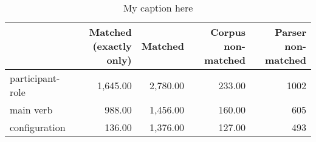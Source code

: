 \begin{table}[!ht]
\centering
\begin{tabular}{lrrrr}
\toprule
{} &  Matched (exactly only) &  Matched &  Corpus non-matched &  Parser non-matched \\
\midrule
participant-role &                1,645.00 & 2,780.00 &              233.00 &                1002 \\
main verb        &                  988.00 & 1,456.00 &              160.00 &                 605 \\
configuration    &                  136.00 & 1,376.00 &              127.00 &                 493 \\
\bottomrule
\end{tabular}
\caption{My caption here}
\label{tab:unit-elements-transitivity-data}
\end{table}
